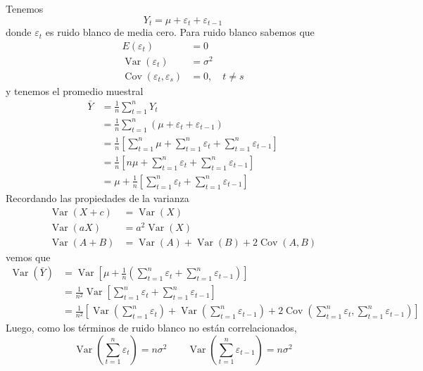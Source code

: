 \documentclass[9pt]{extarticle}
\begin{document}
\hrulefill

Tenemos
\[
Y_t = \mu + \varepsilon_t + \varepsilon_{t-1}
\]
donde $\varepsilon_t$ es ruido blanco de media cero. Para ruido blanco sabemos que
\begin{align*}
E(\varepsilon_t) &= 0\\
\operatorname{Var}(\varepsilon_t) &= \sigma^2\\
\operatorname{Cov}(\varepsilon_t,\varepsilon_s) &= 0, \quad t \neq s
\end{align*}
y tenemos el promedio muestral
\begin{align*}
\bar{Y} &= \frac{1}{n}\sum_{t=1}^{n} Y_t\\
&= \frac{1}{n}\sum_{t=1}^{n}\left(\mu + \varepsilon_t + \varepsilon_{t-1}\right)\\
&= \frac{1}{n}\left[\sum_{t=1}^{n}\mu + \sum_{t=1}^{n}\varepsilon_t + \sum_{t=1}^{n}\varepsilon_{t-1}\right]\\
&= \frac{1}{n}\left[n\mu + \sum_{t=1}^{n}\varepsilon_t + \sum_{t=1}^{n}\varepsilon_{t-1}\right]\\
&= \mu + \frac{1}{n}\left[\sum_{t=1}^{n}\varepsilon_t + \sum_{t=1}^{n}\varepsilon_{t-1}\right]
\end{align*}
Recordando las propiedades de la varianza
\begin{align*}
\operatorname{Var}(X+c) &= \operatorname{Var}(X)\\
\operatorname{Var}(aX) &= a^2\operatorname{Var}(X)\\
\operatorname{Var}(A+B) &= \operatorname{Var}(A)+\operatorname{Var}(B)+2\operatorname{Cov}(A,B)
\end{align*}
vemos que
\begin{align*}
\operatorname{Var}(\bar{Y}) &= \operatorname{Var}\left[\mu + \frac{1}{n}\left(\sum_{t=1}^{n}\varepsilon_t + \sum_{t=1}^{n}\varepsilon_{t-1}\right)\right]\\
&= \frac{1}{n^2}\operatorname{Var}\left[\sum_{t=1}^{n}\varepsilon_t + \sum_{t=1}^{n}\varepsilon_{t-1}\right]\\
&= \frac{1}{n^2}\left[\operatorname{Var}\left(\sum_{t=1}^{n}\varepsilon_t\right) + \operatorname{Var}\left(\sum_{t=1}^{n}\varepsilon_{t-1}\right) + 2\operatorname{Cov}\left(\sum_{t=1}^{n}\varepsilon_t, \sum_{t=1}^{n}\varepsilon_{t-1}\right)\right]
\end{align*}
Luego, como los términos de ruido blanco no están correlacionados,
\[
\boxed{\operatorname{Var}\left(\sum_{t=1}^{n}\varepsilon_t\right) = n\sigma^2}
\qquad
\boxed{\operatorname{Var}\left(\sum_{t=1}^{n}\varepsilon_{t-1}\right) = n\sigma^2}
\]
\end{document}
